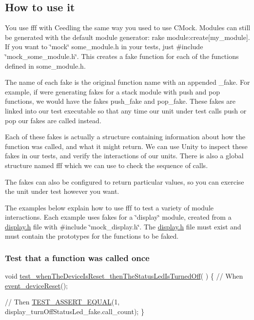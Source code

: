 \subsection*{How to use it}

You use fff with Ceedling the same way you used to use C\+Mock. Modules can still be generated with the default module generator\+: {\ttfamily rake module\+:create\mbox{[}my\+\_\+module\mbox{]}}. If you want to \char`\"{}mock\char`\"{} {\ttfamily some\+\_\+module.\+h} in your tests, just {\ttfamily \#include \char`\"{}mock\+\_\+some\+\_\+module.\+h\char`\"{}}. This creates a fake function for each of the functions defined in {\ttfamily some\+\_\+module.\+h}.

The name of each fake is the original function name with an appended {\ttfamily \+\_\+fake}. For example, if we\textquotesingle{}re generating fakes for a stack module with {\ttfamily push} and {\ttfamily pop} functions, we would have the fakes {\ttfamily push\+\_\+fake} and {\ttfamily pop\+\_\+fake}. These fakes are linked into our test executable so that any time our unit under test calls {\ttfamily push} or {\ttfamily pop} our fakes are called instead.

Each of these fakes is actually a structure containing information about how the function was called, and what it might return. We can use Unity to inspect these fakes in our tests, and verify the interactions of our units. There is also a global structure named {\ttfamily fff} which we can use to check the sequence of calls.

The fakes can also be configured to return particular values, so you can exercise the unit under test however you want.

The examples below explain how to use fff to test a variety of module interactions. Each example uses fakes for a \char`\"{}display\char`\"{} module, created from a \hyperlink{display_8h}{display.\+h} file with {\ttfamily \#include \char`\"{}mock\+\_\+display.\+h\char`\"{}}. The {\ttfamily \hyperlink{display_8h}{display.\+h}} file must exist and must contain the prototypes for the functions to be faked.

\subsubsection*{Test that a function was called once}


\begin{DoxyCode}
\textcolor{keywordtype}{void}
\hyperlink{test__event__processor_8c_aff1f691f0911be5857ddbe01e551c0a2}{test\_whenTheDeviceIsReset\_thenTheStatusLedIsTurnedOff}(
      )
\{
    \textcolor{comment}{// When}
    \hyperlink{event__processor_8c_ae1d8acf4a49fc2dd494f7838a3d290c9}{event\_deviceReset}();

    \textcolor{comment}{// Then}
    \hyperlink{unity_8h_af9e5695d6c7cf634206ea6d062cb54c9}{TEST\_ASSERT\_EQUAL}(1, display\_turnOffStatusLed\_fake.call\_count);
\}
\end{DoxyCode}


